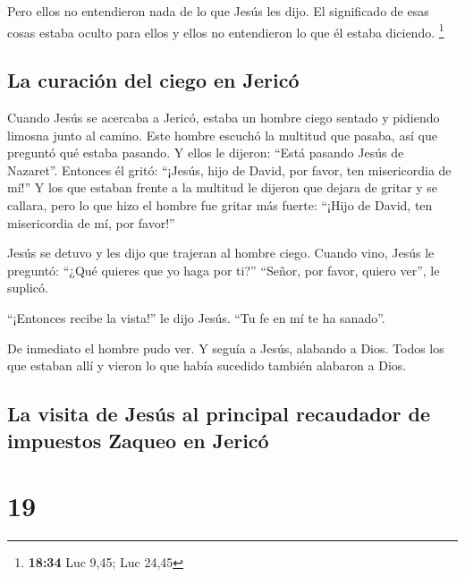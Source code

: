  Pero ellos no entendieron nada de lo que Jesús les dijo.
El significado de esas cosas estaba oculto para ellos y ellos no
entendieron lo que él estaba diciendo. \footnote{\textbf{18:34} Luc
  9,45; Luc 24,45}

\hypertarget{la-curaciuxf3n-del-ciego-en-jericuxf3}{%
\subsection{La curación del ciego en
Jericó}\label{la-curaciuxf3n-del-ciego-en-jericuxf3}}

 Cuando Jesús se acercaba a Jericó, estaba un hombre
ciego sentado y pidiendo limosna junto al camino.  Este
hombre escuchó la multitud que pasaba, así que preguntó qué estaba
pasando.  Y ellos le dijeron: ``Está pasando Jesús de
Nazaret''.  Entonces él gritó: ``¡Jesús, hijo de David,
por favor, ten misericordia de mí!''  Y los que estaban
frente a la multitud le dijeron que dejara de gritar y se callara, pero
lo que hizo el hombre fue gritar más fuerte: ``¡Hijo de David, ten
misericordia de mí, por favor!''

 Jesús se detuvo y les dijo que trajeran al hombre ciego.
Cuando vino, Jesús le preguntó:  ``¿Qué quieres que yo
haga por ti?'' ``Señor, por favor, quiero ver'', le suplicó.

 ``¡Entonces recibe la vista!'' le dijo Jesús. ``Tu fe en
mí te ha sanado''.

 De inmediato el hombre pudo ver. Y seguía a Jesús,
alabando a Dios. Todos los que estaban allí y vieron lo que había
sucedido también alabaron a Dios.

\hypertarget{la-visita-de-jesuxfas-al-principal-recaudador-de-impuestos-zaqueo-en-jericuxf3}{%
\subsection{La visita de Jesús al principal recaudador de impuestos
Zaqueo en
Jericó}\label{la-visita-de-jesuxfas-al-principal-recaudador-de-impuestos-zaqueo-en-jericuxf3}}

\hypertarget{section-18}{%
\section{19}\label{section-18}}


